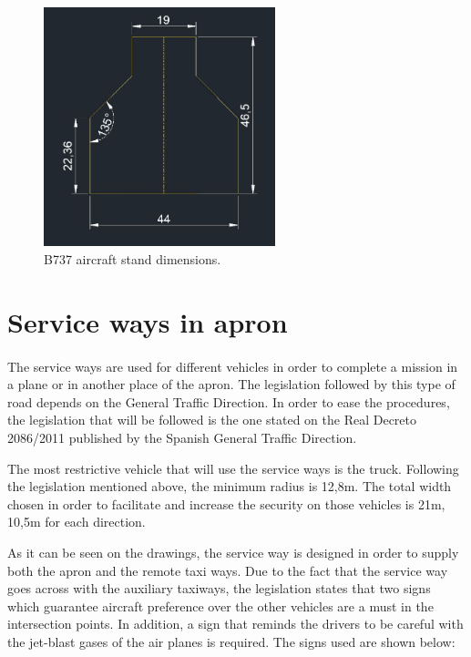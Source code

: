 		\begin{figure}[H]
			\centering
			\includegraphics[clip, trim=0cm 0cm 0cm 0cm, width=0.6\textwidth]{./images/B737/StandB737}
			\caption{B737 aircraft stand dimensions.} %
			\label{} %
		\end{figure}
			
	\section{Service ways in apron}
	\paragraph{} The service ways are used for different vehicles in order to complete a mission in a plane or in another place of the apron. The legislation followed by this type of road depends on the General Traffic Direction. In order to ease the procedures, the legislation that will be followed is the one stated on the Real Decreto 2086/2011 published by the Spanish General Traffic Direction. 
	
	The most restrictive vehicle that will use the service ways is the truck. Following the legislation mentioned above, the minimum radius is 12,8m. The total width chosen in order to facilitate and increase the security on those vehicles is 21m, 10,5m for each direction.
	
	As it can be seen on the drawings, the service way is designed in order to supply both the apron and the remote taxi ways. Due to the fact that the service way goes across with the auxiliary taxiways, the legislation states that two signs which guarantee aircraft preference over the other vehicles are a must in the intersection points. In addition, a sign that reminds the drivers to be careful with the jet-blast gases of the air planes is required. The signs used are shown below:
	
